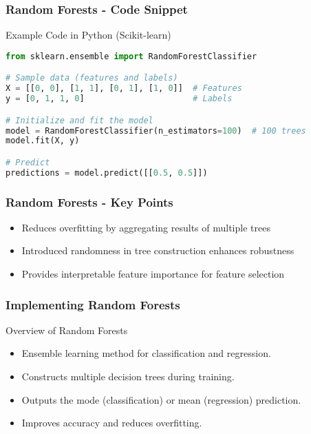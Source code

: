 \documentclass[aspectratio=169]{beamer}
\begin{document}
\begin{frame}[fragile]
    \frametitle{Random Forests - Code Snippet}
    \begin{block}{Example Code in Python (Scikit-learn)}
    \begin{lstlisting}[language=Python]
from sklearn.ensemble import RandomForestClassifier

# Sample data (features and labels)
X = [[0, 0], [1, 1], [0, 1], [1, 0]]  # Features
y = [0, 1, 1, 0]                      # Labels

# Initialize and fit the model
model = RandomForestClassifier(n_estimators=100)  # 100 trees
model.fit(X, y)

# Predict
predictions = model.predict([[0.5, 0.5]])
    \end{lstlisting}
    \end{block}
\end{frame}

\begin{frame}[fragile]
    \frametitle{Random Forests - Key Points}
    \begin{itemize}
        \item Reduces overfitting by aggregating results of multiple trees
        \item Introduced randomness in tree construction enhances robustness
        \item Provides interpretable feature importance for feature selection
    \end{itemize}
\end{frame}

\begin{frame}
    \frametitle{Implementing Random Forests}
    \begin{block}{Overview of Random Forests}
        \begin{itemize}
            \item Ensemble learning method for classification and regression.
            \item Constructs multiple decision trees during training.
            \item Outputs the mode (classification) or mean (regression) prediction.
            \item Improves accuracy and reduces overfitting.
        \end{itemize}
    \end{block}
\end{frame}
\end{document}
